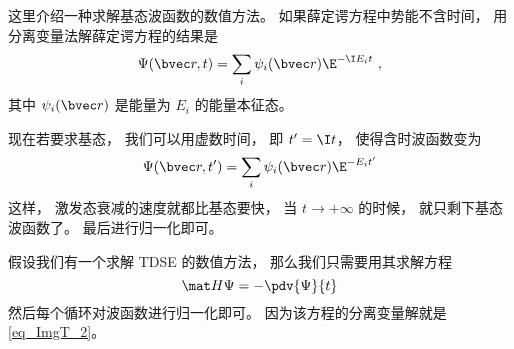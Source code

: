 
\begin{issues}
\issueDraft
\end{issues}

这里介绍一种求解基态波函数的数值方法。 如果薛定谔方程中势能不含时间， 用分离变量法解薛定谔方程的结果是
\begin{equation}
\Psi(\bvec r, t) = \sum_i \psi_i(\bvec r) \E^{-\I E_i t}~,
\end{equation}
其中 $\psi_i(\bvec r)$ 是能量为 $E_i$ 的能量本征态。

现在若要求基态， 我们可以用虚数时间， 即 $t' = \I t$， 使得含时波函数变为
\begin{equation}\label{eq_ImgT_2}
\Psi(\bvec r, t') = \sum_i \psi_i(\bvec r) \E^{- E_i t'}
\end{equation}
这样， 激发态衰减的速度就都比基态要快， 当 $t \to +\infty$ 的时候， 就只剩下基态波函数了。 最后进行归一化即可。

假设我们有一个求解 TDSE 的数值方法， 那么我们只需要用其求解方程
\begin{equation}
\mat H\Psi = -\pdv{\Psi}{t}
\end{equation}
然后每个循环对波函数进行归一化即可。 因为该方程的分离变量解就是\autoref{eq_ImgT_2}。
